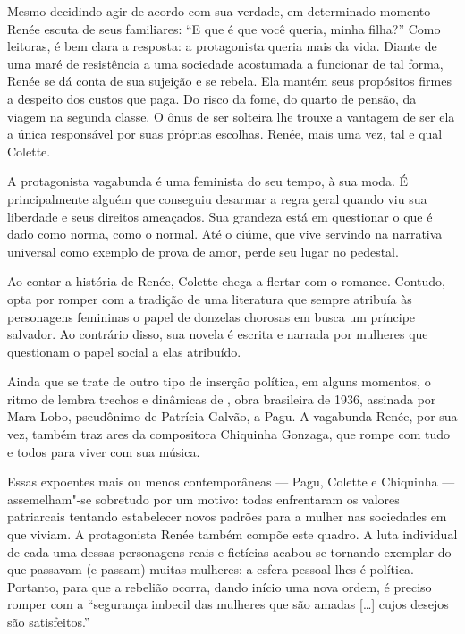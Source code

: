 Mesmo decidindo agir de acordo com sua verdade, em determinado momento Renée escuta de seus familiares: “E que é que você queria, minha filha?” Como leitoras, é bem clara a resposta: a protagonista queria mais da vida. Diante de uma maré de resistência a uma sociedade acostumada a funcionar de tal forma, Renée se dá conta de sua sujeição e se rebela. Ela mantém seus propósitos firmes a despeito dos custos que paga. Do risco da fome, do quarto de pensão, da viagem na segunda classe. O ônus de ser solteira lhe trouxe a vantagem de ser ela a única responsável por suas próprias escolhas. Renée, mais uma vez, tal e qual Colette. 

A protagonista vagabunda é uma feminista do seu tempo, à sua moda. É principalmente alguém que conseguiu desarmar a regra geral quando viu sua liberdade e seus direitos ameaçados. Sua grandeza está em questionar o que é dado como norma, como o normal. Até o ciúme, que vive servindo na narrativa universal como exemplo de prova de amor, perde seu lugar no pedestal. 

Ao contar a história de Renée, Colette chega a flertar com o romance. Contudo, opta por romper com a tradição de uma literatura que sempre atribuía às personagens femininas o papel de donzelas chorosas em busca um príncipe salvador. Ao contrário disso, sua novela é escrita e narrada por mulheres que questionam o papel social a elas atribuído.

Ainda que se trate de outro tipo de inserção política, em alguns momentos, o ritmo de {} lembra trechos e dinâmicas de {}, obra brasileira de 1936, assinada por Mara Lobo, pseudônimo de Patrícia Galvão, a Pagu. A vagabunda Renée, por sua vez, também traz ares da compositora Chiquinha Gonzaga, que rompe com tudo e todos para viver com sua música.

Essas expoentes mais ou menos contemporâneas --- Pagu, Colette e Chiquinha --- assemelham"-se sobretudo por um motivo: todas enfrentaram os valores patriarcais tentando estabelecer novos padrões para a mulher nas sociedades em que viviam. A protagonista Renée também compõe este quadro. A luta individual de cada uma dessas personagens reais e fictícias acabou se tornando exemplar do que passavam (e passam) muitas mulheres: a esfera pessoal lhes é política. Portanto, para que a rebelião ocorra, dando início uma nova ordem, é preciso romper com a “segurança imbecil das mulheres que são amadas [\ldots{}] cujos desejos são satisfeitos.”

